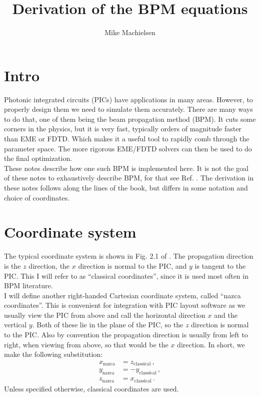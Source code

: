 \documentclass[]{article}
\title{Derivation of the BPM equations}
\author{Mike Machielsen}
\begin{document}
	
	\maketitle
	
	
	\section{Intro}
	Photonic integrated circuits (PICs) have applications in many areas. However, to properly design them we need to simulate them accurately. There are many ways to do that, one of them being the beam propagation method (BPM). It cuts some corners in the physics, but it is very fast, typically orders of magnitude faster than EME or FDTD. Which makes it a useful tool to rapidly comb through the parameter space. The more rigorous EME/FDTD solvers can then be used to do the final optimization.\\	
	
	These notes describe how one such BPM is implemented here. It is not the goal of these notes to exhaustively describe BPM, for that see Ref. \cite{Lifante_2015}. The derivation in these notes follows along the lines of the book, but differs in some notation and choice of coordinates. %
	
	\section{Coordinate system}
	The typical coordinate system is shown in Fig. 2.1 of \cite{Lifante_2015}. The propagation direction is the $z$ direction, the $x$ direction is normal to the PIC, and $y$ is tangent to the PIC. This I will refer to as ``classical coordinates'', since it is used most often in BPM literature.\\
	
	I will define another right-handed Cartesian coordinate system, called ``nazca coordinates''. This is convenient for integration with PIC layout software as we usually view the PIC from above and call the horizontal direction $x$ and the vertical $y$. Both of these lie in the plane of the PIC, so the $z$ direction is normal to the PIC. Also by convention the propagation direction is usually from left to right, when viewing from above, so that would be the $x$ direction. In short, we make the following substitution:
	\begin{subequations}
		\begin{align}
			x_\text{nazca} &= z_\text{classical}\, ,\\
			y_\text{nazca} &= -y_\text{classical}\, , \\
			z_\text{nazca} &= x_\text{classical}\, .
		\end{align}
	\end{subequations}
	Unless specified otherwise, classical coordinates are used.
	
\end{document}
